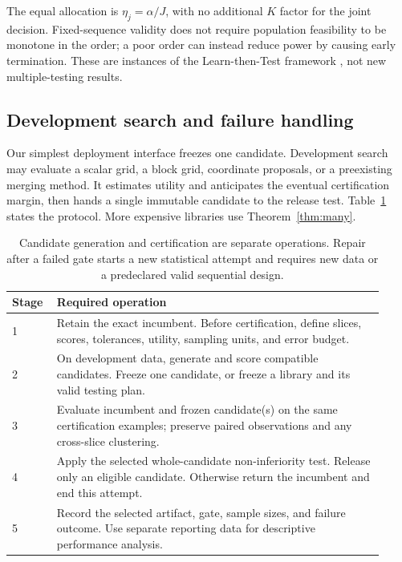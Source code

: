 \documentclass[11pt,letterpaper]{article}
\begin{document}
The equal allocation is $\eta_j=\alpha/J$, with no additional $K$ factor for the joint decision. Fixed-sequence validity does not require population feasibility to be monotone in the order; a poor order can instead reduce power by causing early termination. These are instances of the Learn-then-Test framework \citep{angelopoulos2022ltt}, not new multiple-testing results.

\subsection{Development search and failure handling}
Our simplest deployment interface freezes one candidate. Development search may evaluate a scalar grid, a block grid, coordinate proposals, or a preexisting merging method. It estimates utility and anticipates the eventual certification margin, then hands a single immutable candidate to the release test. Table~\ref{tab:algorithm} states the protocol. More expensive libraries use Theorem~\ref{thm:many}.

\begin{table}[t]
\centering\small
\begin{tabular}{p{0.10\linewidth}p{0.82\linewidth}}
\toprule
Stage & Required operation \\
\midrule
1 & Retain the exact incumbent. Before certification, define slices, scores, tolerances, utility, sampling units, and error budget. \\
2 & On development data, generate and score compatible candidates. Freeze one candidate, or freeze a library and its valid testing plan. \\
3 & Evaluate incumbent and frozen candidate(s) on the same certification examples; preserve paired observations and any cross-slice clustering. \\
4 & Apply the selected whole-candidate non-inferiority test. Release only an eligible candidate. Otherwise return the incumbent and end this attempt. \\
5 & Record the selected artifact, gate, sample sizes, and failure outcome. Use separate reporting data for descriptive performance analysis. \\
\bottomrule
\end{tabular}
\caption{Candidate generation and certification are separate operations. Repair after a failed gate starts a new statistical attempt and requires new data or a predeclared valid sequential design.}
\label{tab:algorithm}
\end{table}
\end{document}
